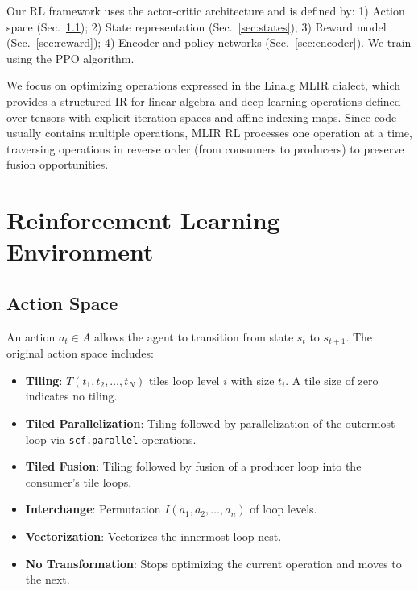 \documentclass[10pt,twocolumn]{article}
\begin{document}
Our RL framework uses the actor-critic architecture and is defined by: 1) Action space (Sec.~\ref{sec:actionspace}); 2) State representation (Sec.~\ref{sec:states}); 3) Reward model (Sec.~\ref{sec:reward}); 4) Encoder and policy networks (Sec.~\ref{sec:encoder}). We train using the PPO algorithm.

We focus on optimizing operations expressed in the Linalg MLIR dialect, which provides a structured IR for linear-algebra and deep learning operations defined over tensors with explicit iteration spaces and affine indexing maps. Since code usually contains multiple operations, MLIR RL processes one operation at a time, traversing operations in reverse order (from consumers to producers) to preserve fusion opportunities.

\section{Reinforcement Learning Environment}

\subsection{Action Space}
\label{sec:actionspace}

An action $a_t \in A$ allows the agent to transition from state $s_t$ to $s_{t+1}$. The original action space includes:

\begin{itemize}
\item \textbf{Tiling}: $T(t_1, t_2, \ldots, t_N)$ tiles loop level $i$ with size $t_i$. A tile size of zero indicates no tiling.
\item \textbf{Tiled Parallelization}: Tiling followed by parallelization of the outermost loop via \texttt{scf.parallel} operations.
\item \textbf{Tiled Fusion}: Tiling followed by fusion of a producer loop into the consumer's tile loops.
\item \textbf{Interchange}: Permutation $I(a_1, a_2, \ldots, a_n)$ of loop levels.
\item \textbf{Vectorization}: Vectorizes the innermost loop nest.
\item \textbf{No Transformation}: Stops optimizing the current operation and moves to the next.
\end{itemize}
\end{document}
